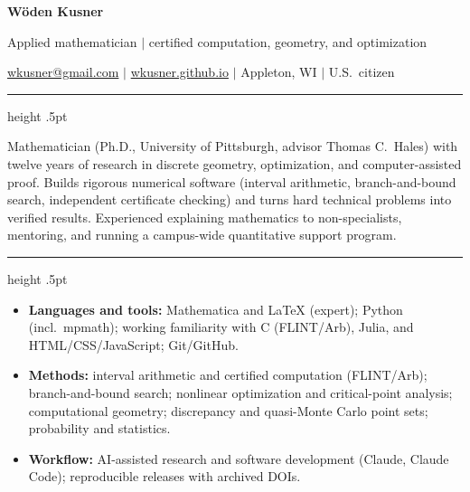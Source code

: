 \documentclass[11pt]{article}
\newcommand{\sect}[1]{\par\vspace{7pt}{\large\bfseries #1}\par\vspace{1pt}%
  {\color{rule}\hrule height .5pt}\vspace{4pt}}
\begin{document}
{\LARGE\bfseries W\"oden Kusner}\par\vspace{2pt}
Applied mathematician $|$ certified computation, geometry, and optimization\par\vspace{2pt}
\href{mailto:wkusner@gmail.com}{wkusner@gmail.com} $|$
\href{https://wkusner.github.io}{wkusner.github.io} $|$
Appleton, WI $|$ U.S.\ citizen

\sect{Summary}
Mathematician (Ph.D., University of Pittsburgh, advisor Thomas C.~Hales) with twelve years of research in
discrete geometry, optimization, and computer-assisted proof. Builds rigorous numerical software
(interval arithmetic, branch-and-bound search, independent certificate checking) and turns hard technical
problems into verified results. Experienced explaining mathematics to non-specialists, mentoring, and
running a campus-wide quantitative support program.

\sect{Technical Skills}
\begin{itemize}
  \item \textbf{Languages and tools:} Mathematica and \LaTeX{} (expert); Python (incl.\ mpmath); working
        familiarity with C (FLINT/Arb), Julia, and HTML/CSS/JavaScript; Git/GitHub.
  \item \textbf{Methods:} interval arithmetic and certified computation (FLINT/Arb); branch-and-bound search;
        nonlinear optimization and critical-point analysis; computational geometry; discrepancy and
        quasi-Monte Carlo point sets; probability and statistics.
  \item \textbf{Workflow:} AI-assisted research and software development (Claude, Claude Code); reproducible
        releases with archived DOIs.
\end{itemize}
\end{document}
